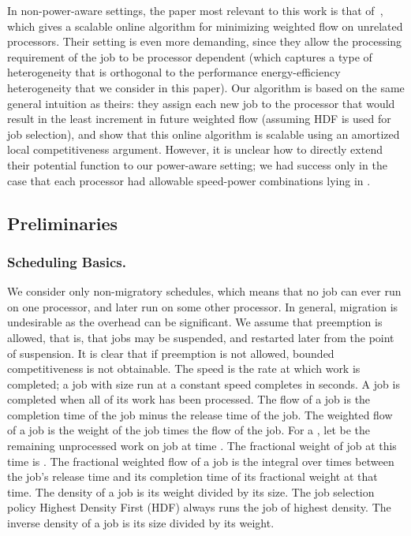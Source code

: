 \documentclass[11pt]{article}
\begin{document}
In non-power-aware settings, the paper most relevant to this work is
that of~\cite{Chadha2009}, which gives a scalable online algorithm for
minimizing weighted flow on unrelated processors. Their setting is even
more demanding, since they allow the processing requirement of the job
to be processor dependent (which captures a type of heterogeneity that
is orthogonal to the performance energy-efficiency heterogeneity that we
consider in this paper). Our algorithm is based on the same general
intuition as theirs: they assign each new job to the processor that
would result in the least increment in future weighted flow (assuming
HDF is used for job selection), and show that this online algorithm is
scalable using an amortized local competitiveness argument.  However, it
is unclear how to directly extend their potential function to our
power-aware setting; we  had success only in the case that each processor
had allowable speed-power combinations lying in .





\subsection{Preliminaries}
\label{sec:preliminaries}

\subsubsection{Scheduling Basics.}
We consider only non-migratory schedules, which means that no job can
ever run on one processor, and later run on some other processor. In
general, migration is undesirable as the overhead can be significant. We
assume that preemption is allowed, that is, that jobs may be suspended,
and restarted later from the point of suspension.  It is clear that if
preemption is not allowed, bounded competitiveness is not
obtainable.  The speed is the rate at which work is completed; a job 
with size  run at a constant speed  completes in 
seconds. A job is completed when all of its work has been  processed.
The flow of a job is the completion time of the job minus the release time of the job.
The weighted flow of a job is the weight of the job times the flow of the job.
For a , let  be the remaining unprocessed
work on job  at time . The  fractional weight of job  at this
time is .
The fractional weighted flow of a job is the integral over times
between the job's release time
and its completion time of its fractional weight at that time.
The density of a job is its weight divided by its size.
The job selection policy Highest Density First (HDF) always runs the job of highest density.
The inverse density of a job is its size divided by its weight.
\end{document}
